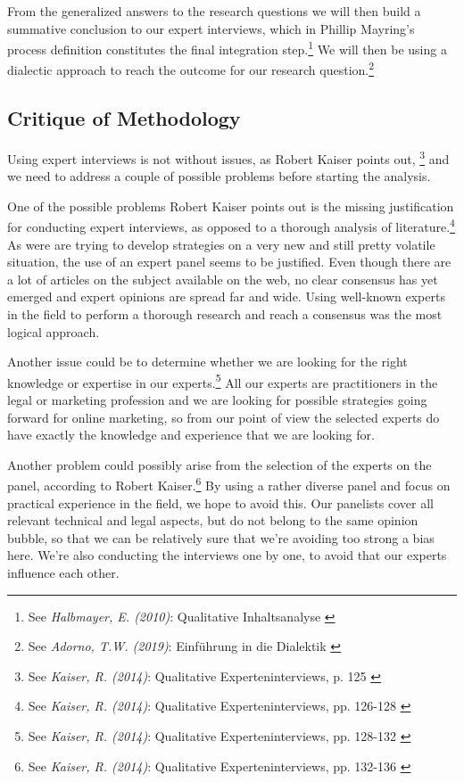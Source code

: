 From the generalized answers to the research questions we will then build a summative conclusion to our expert interviews, which in Phillip Mayring's process definition constitutes the final integration step.\footnote{See \textit{Halbmayer, E. (2010)}: Qualitative Inhaltsanalyse \cite{summaryVienna}} We will then be using a dialectic approach to reach the outcome for our research question.\footnote{See \textit{Adorno, T.W. (2019)}: Einführung in die Dialektik \cite{introDialectic}}

\subsection{Critique of Methodology}

Using expert interviews is not without issues, as Robert Kaiser points out, \footnote{See \textit{Kaiser, R. (2014)}: Qualitative Experteninterviews, p. 125 \cite{expertInterviews}} and we need to address a couple of possible problems before starting the analysis.

One of the possible problems Robert Kaiser points out is the missing justification for conducting expert interviews, as opposed to a thorough analysis of literature.\footnote{See \textit{Kaiser, R. (2014)}: Qualitative Experteninterviews, pp. 126-128 \cite{expertInterviews}} As were are trying to develop strategies on a very new and still pretty volatile situation, the use of an expert panel seems to be justified. Even though there are a lot of articles on the subject available on the web, no clear consensus has yet emerged and expert opinions are spread far and wide. Using well-known experts in the field to perform a thorough research and reach a consensus was the most logical approach.

Another issue could be to determine whether we are looking for the right knowledge or expertise in our experts.\footnote{See \textit{Kaiser, R. (2014)}: Qualitative Experteninterviews, pp. 128-132 \cite{expertInterviews}} All our experts are practitioners in the legal or marketing profession and we are looking for possible strategies going forward for online marketing, so from our point of view the selected experts do have exactly the knowledge and experience that we are looking for.

Another problem could possibly arise from the selection of the experts on the panel, according to Robert Kaiser.\footnote{See \textit{Kaiser, R. (2014)}: Qualitative Experteninterviews, pp. 132-136 \cite{expertInterviews}} By using a rather diverse panel and focus on practical experience in the field, we hope to avoid this. Our panelists cover all relevant technical and legal aspects, but do not belong to the same opinion bubble, so that we can be relatively sure that we're avoiding too strong a bias here. We're also conducting the interviews one by one, to avoid that our experts influence each other.

